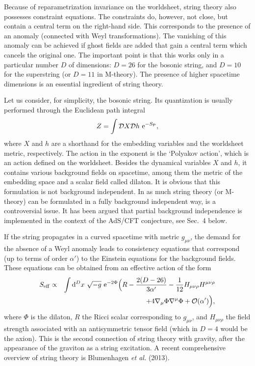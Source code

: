 \documentclass[12pt,a4paper]{article}
\newcommand{\be}{\begin{equation}}
\newcommand{\ee}{\end{equation}}
\newcommand{\bea}{\begin{eqnarray}}
\newcommand{\eea}{\end{eqnarray}}
\newcommand{\lb}{\label}
\newcommand{\D}{{\rm d}}
\newcommand{\E}{{\rm e}}
\begin{document}
Because of reparametrization invariance on the worldsheet, string
theory also possesses constraint equations. The constraints do,
however, not close, but contain a central term on the right-hand
side. This corresponds to the presence of an anomaly (connected with
Weyl transformations). The vanishing of this anomaly can be achieved
if ghost fields are added that gain a central term which cancels the
original one. The important point is that this works only in a
particular number $D$ of dimensions: $D=26$ for the bosonic string,
and $D=10$ for the superstring (or $D=11$ in M-theory). The presence
of higher spacetime 
dimensions is an essential ingredient of string theory.   

Let us consider, for simplicity, the bosonic string. Its quantization
is usually performed through the Euclidean path integral
\be
\lb{9.2.2}
Z=\int{\mathcal D}X{\mathcal D}h\ \E^{-S_{\rm P}},
\ee
where $X$ and $h$ are a shorthand for the embedding variables and the
worldsheet metric, respectively. The action in the exponent is the
`Polyakov action', which is an action defined on the
worldsheet. Besides the dynamical variables $X$ and $h$, it contains
various background fields on spacetime, among them the metric of the
embedding space and a scalar field called dilaton. It is obvious that
this formulation is not background independent. In as much string
theory (or M-theory) can be formulated in a fully background
independent way, is a controversial issue. It has been argued that
partial background independence is implemented in the context of the
AdS/CFT conjecture, see Sec.~4 below.

If the string propagates in a curved spacetime with metric
$g_{\mu\nu}$, the demand for the absence of a Weyl anomaly leads to
consistency equations that correspond (up to terms of order $\alpha'$)
to the Einstein equations for the background fields. These equations
can be obtained from an effective action of the form
\bea
\lb{9.2.14}
S_{\rm eff} & \propto & 
\int\D^Dx\ \sqrt{-g}\ \E^{-2\Phi}\Big(R-\frac{2(D-26)}
{3\alpha'}-\frac{1}{12}H_{\mu\nu\rho}H^{\mu\nu\rho}
\nonumber\\
& & \; \;\;\;\; +4\nabla_{\mu}\Phi\nabla^{\mu}\Phi+{\mathcal O}(\alpha') 
\Big) ,
\eea
where $\Phi$ is the dilaton, $R$ the Ricci scalar corresponding to 
$g_{\mu\nu}$, and $H_{\mu\nu\rho}$ the field strength associated with
an antisymmetric tensor field (which in $D=4$ would be the axion). 
This is the second connection of string theory with gravity, after the
appearance of the graviton as a string excitation.
A recent comprehensive overview of string theory is Blumenhagen {\em
  et al.} (2013).
\end{document}
